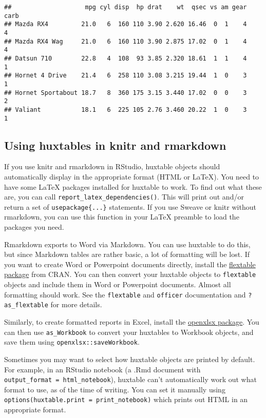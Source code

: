 \documentclass[]{article}
\begin{document}
\begin{verbatim}
##                    mpg cyl disp  hp drat    wt  qsec vs am gear carb
## Mazda RX4         21.0   6  160 110 3.90 2.620 16.46  0  1    4    4
## Mazda RX4 Wag     21.0   6  160 110 3.90 2.875 17.02  0  1    4    4
## Datsun 710        22.8   4  108  93 3.85 2.320 18.61  1  1    4    1
## Hornet 4 Drive    21.4   6  258 110 3.08 3.215 19.44  1  0    3    1
## Hornet Sportabout 18.7   8  360 175 3.15 3.440 17.02  0  0    3    2
## Valiant           18.1   6  225 105 2.76 3.460 20.22  1  0    3    1
\end{verbatim}

\FloatBarrier

\subsection{Using huxtables in knitr and
rmarkdown}\label{using-huxtables-in-knitr-and-rmarkdown}

If you use knitr and rmarkdown in RStudio, huxtable objects should
automatically display in the appropriate format (HTML or LaTeX). You
need to have some LaTeX packages installed for huxtable to work. To find
out what these are, you can call \texttt{report\_latex\_dependencies()}.
This will print out and/or return a set of \texttt{usepackage\{...\}}
statements. If you use Sweave or knitr without rmarkdown, you can use
this function in your LaTeX preamble to load the packages you need.

Rmarkdown exports to Word via Markdown. You can use huxtable to do this,
but since Markdown tables are rather basic, a lot of formatting will be
lost. If you want to create Word or Powerpoint documents directly,
install the
\href{https://cran.r-project.org/package=flextable}{flextable package}
from CRAN. You can then convert your huxtable objects to
\texttt{flextable} objects and include them in Word or Powerpoint
documents. Almost all formatting should work. See the \texttt{flextable}
and \texttt{officer} documentation and \texttt{?as\_flextable} for more
details.

Similarly, to create formatted reports in Excel, install the
\href{https://cran.r-project.org/package=openxlsx}{openxlsx package}.
You can then use \texttt{as\_Workbook} to convert your huxtables to
Workbook objects, and save them using \texttt{openxlsx::saveWorkbook}.

Sometimes you may want to select how huxtable objects are printed by
default. For example, in an RStudio notebook (a .Rmd document with
\texttt{output\_format\ =\ html\_notebook}), huxtable can't
automatically work out what format to use, as of the time of writing.
You can set it manually using
\texttt{options(huxtable.print\ =\ print\_notebook)} which prints out
HTML in an appropriate format.
\end{document}

